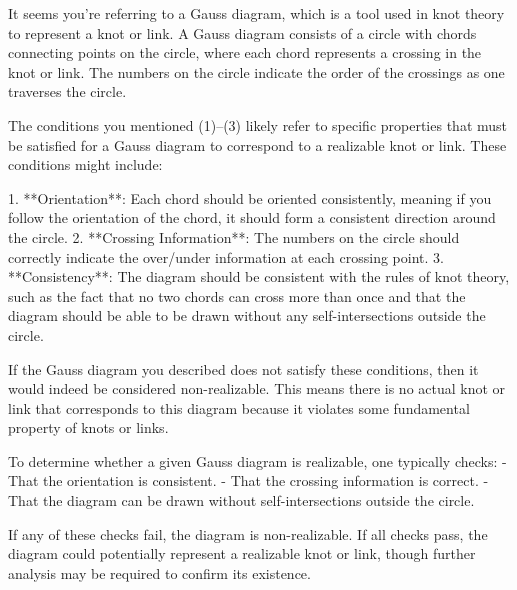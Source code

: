 It seems you're referring to a Gauss diagram, which is a tool used in knot theory to represent a knot or link. A Gauss diagram consists of a circle with chords connecting points on the circle, where each chord represents a crossing in the knot or link. The numbers on the circle indicate the order of the crossings as one traverses the circle.

The conditions you mentioned (1)--(3) likely refer to specific properties that must be satisfied for a Gauss diagram to correspond to a realizable knot or link. These conditions might include:

1. **Orientation**: Each chord should be oriented consistently, meaning if you follow the orientation of the chord, it should form a consistent direction around the circle.
2. **Crossing Information**: The numbers on the circle should correctly indicate the over/under information at each crossing point.
3. **Consistency**: The diagram should be consistent with the rules of knot theory, such as the fact that no two chords can cross more than once and that the diagram should be able to be drawn without any self-intersections outside the circle.

If the Gauss diagram you described does not satisfy these conditions, then it would indeed be considered non-realizable. This means there is no actual knot or link that corresponds to this diagram because it violates some fundamental property of knots or links.

To determine whether a given Gauss diagram is realizable, one typically checks:
- That the orientation is consistent.
- That the crossing information is correct.
- That the diagram can be drawn without self-intersections outside the circle.

If any of these checks fail, the diagram is non-realizable. If all checks pass, the diagram could potentially represent a realizable knot or link, though further analysis may be required to confirm its existence.